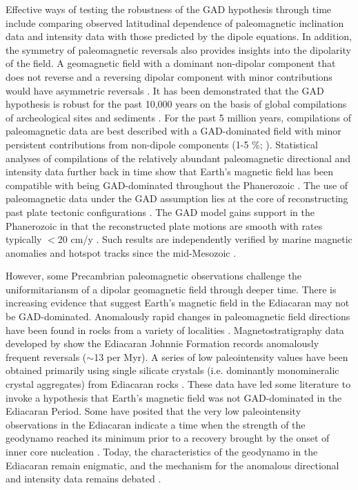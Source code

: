 Effective ways of testing the robustness of the GAD hypothesis through time include comparing observed latitudinal dependence of paleomagnetic inclination data and intensity data with those predicted by the dipole equations. In addition, the symmetry of paleomagnetic reversals also provides insights into the dipolarity of the field. A geomagnetic field with a dominant non-dipolar component that does not reverse and a reversing dipolar component with minor contributions would have asymmetric reversals \citep[e.g.][]{Pesonen1981a, Pesonen1983a}. It has been demonstrated that the GAD hypothesis is robust for the past 10,000 years on the basis of global compilations of archeological sites and sediments \cite[e.g.][]{McElhinny1996a}. For the past 5 million years, compilations of paleomagnetic data are best described with a GAD-dominated field with minor persistent contributions from non-dipole components (1-5 \%; \citealp{Tauxe2005a, Valet2011b}). Statistical analyses of compilations of the relatively abundant paleomagnetic directional and intensity data further back in time show that Earth's magnetic field has been compatible with being GAD-dominated throughout the Phanerozoic \citep{Evans1976a, Lhuillier2023a}. The use of paleomagnetic data under the GAD assumption lies at the core of reconstructing past plate tectonic configurations \citep{Creer1954a, Irving1977a, Besse2002a, Torsvik2012a}. The GAD model gains support in the Phanerozoic in that the reconstructed plate motions are smooth with rates typically $<$20 cm/y \citep{Torsvik2012a}. Such results are independently verified by marine magnetic anomalies and hotspot tracks since the mid-Mesozoic \citep{Doubrovine2012a, Muller1993a}.

However, some Precambrian paleomagnetic observations challenge the uniformitariansm of a dipolar geomagnetic field through deeper time. There is increasing evidence that suggest Earth's magnetic field in the Ediacaran may not be GAD-dominated. Anomalously rapid changes in paleomagnetic field directions have been found in rocks from a variety of localities \cite[e.g.][]{Abrajevitch2010a, Meert2014a, Halls2015a}. Magnetostratigraphy data developed by \cite{Kodama2021a} show the Ediacaran Johnnie Formation records anomalously frequent reversals ($\sim$13 per Myr). A series of low paleointensity values have been obtained primarily using single silicate crystals (i.e. dominantly monomineralic crystal aggregates) from Ediacaran rocks \citep{Bono2019a, Thallner2021b, Thallner2021a}. These data have led some literature to invoke a hypothesis that Earth's magnetic field was not GAD-dominated in the Ediacaran Period. Some have posited that the very low paleointensity observations in the Ediacaran indicate a time when the strength of the geodynamo reached its minimum prior to a recovery brought by the onset of inner core nucleation \cite[e.g.][]{Bono2019a}. Today, the characteristics of the geodynamo in the Ediacaran remain enigmatic, and the mechanism for the anomalous directional and intensity data remains debated \citep{Domeier2023a}.

